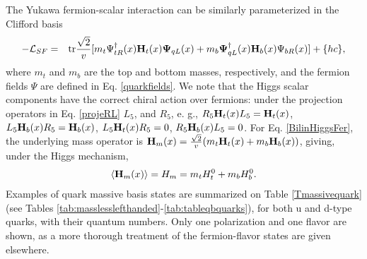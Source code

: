 \documentclass[12pt]{article}
\renewcommand\[{\begin{dmath}}
\renewcommand\]{\end{dmath}}
\newcommand{\boldmathPsi}{\mbox{\boldmath$\Psi$\unboldmath}}
\begin{document}
The Yukawa fermion-scalar interaction can be similarly parameterized in the Clifford basis
\begin{eqnarray}
\label {BilinHiggsFer}
-{\cal L}_{SF}&=& {\rm tr}
   \frac{\sqrt{2}}{v}  [ m_t   \Psi_{tR} ^\dagger(x) {\bf   H}_{t}(x) { \boldmathPsi}_{qL}(x) +
 m_b {  \boldmathPsi}_{qL}  ^\dagger(x) {\bf  H}_{b}(x) \Psi_{bR} (x)]    +\{ hc \},
\end{eqnarray}
where  $m_t$ and  $m_b$ are the top and bottom masses, respectively, and the fermion fields $\Psi$ are defined in Eq. \ref{quarkfields}.
We note  that the Higgs scalar components  have the  correct chiral  action  over   fermions: under the    projection operators in Eq. \ref{projeRL} $L_5$, and  $R_5$,
 e. g., $R_5{\bf H}_{ t}(x)L_5={\bf H}_{ t}(x)$, $L_5{\bf H}_{ b}(x)R_5={\bf H}_{ b}(x)$, $L_5{\bf H}_{ t}(x)R_5=0$,
$R_5{\bf H}_{ b}(x)L_5=0$.
For Eq. \ref{BilinHiggsFer}, the underlying    mass operator
is ${\bf H}_m(x)=\frac{\sqrt{2}}{v} (m_t {\bf  H}_{t}(x)+m_b {\bf  H}_{b}(x))$, giving,  under the Higgs mechanism, \begin{eqnarray} \label{HmVacuum}  \langle{\bf H}_m(x)  \rangle=H_m =  m_t {  H}_{t}^0 +m_b    H _{b}^0. \end{eqnarray}
Examples of quark massive basis states
 are summarized on Table \ref{Tmassivequark} (see Tables  \ref{tab:masslesslefthanded}-\ref{tab:tableqbquarks}), for both u and d-type quarks, with their quantum numbers.
 Only one polarization and one flavor are shown, as a
more thorough treatment of the fermion-flavor states  are given elsewhere\cite{Romero}.
\end{document}
